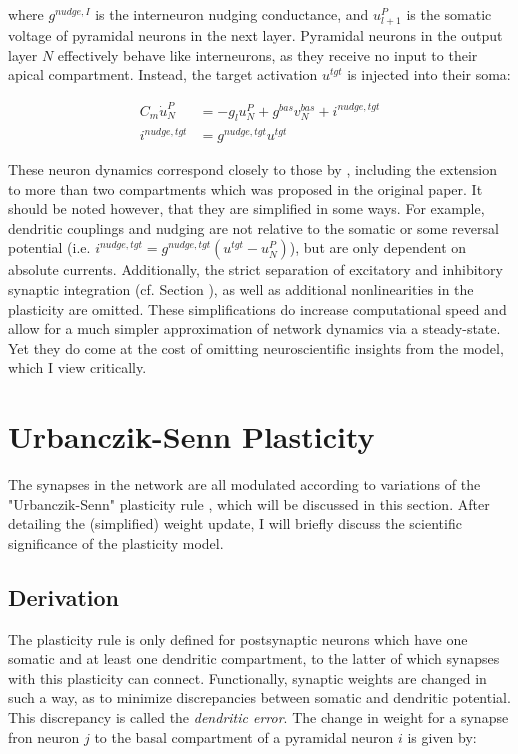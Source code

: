 where $ g^{nudge, I}$ is the interneuron nudging conductance, and $u_{l+1}^P$ is the somatic voltage of pyramidal
neurons in the next layer.  Pyramidal neurons in the output layer $N$ effectively behave like interneurons, as they
receive no input to their apical compartment. Instead, the target  activation $u^{tgt}$ is injected into their soma:

\begin{align}
  C_m \dot{u}_N^P & = - g_l u_N^{P} + g^{bas} v_N^{bas} + i^{nudge, tgt} \\
  i^{nudge, tgt}  & = g^{nudge, tgt} u^{tgt}
\end{align}


These neuron dynamics correspond closely to those by \cite{urbanczik2014learning}, including the extension to more than
two compartments which was proposed in the original paper. It should be noted however, that they are simplified in some
 ways. For example, dendritic couplings and nudging are not relative to the somatic or some reversal potential (i.e.
$i^{nudge, tgt}= g^{nudge, tgt} (u^{tgt} - u_N^P )$), but are only dependent on absolute currents. Additionally, the 
strict separation of excitatory and inhibitory synaptic integration (cf. Section ), as well as additional nonlinearities in the 
plasticity are omitted.  These simplifications do increase computational speed and allow for a much simpler approximation
of network dynamics via a steady-state. Yet they do come at the cost of omitting neuroscientific insights from the model,
which I view critically. \phrasing




\section{Urbanczik-Senn Plasticity}\label{sec-urb-senn-plast}

The synapses in the network are all modulated according to variations of the "Urbanczik-Senn" plasticity rule
\citep{urbanczik2014learning}, which will be discussed in this section. After detailing the (simplified) weight update,
I will briefly discuss the scientific significance of the plasticity model.

\subsection{Derivation}

The plasticity rule is only defined for postsynaptic neurons which have one somatic and at least one dendritic
compartment, to the latter of which synapses with this plasticity can connect. Functionally, synaptic weights are 
changed in such a way, as to minimize discrepancies between somatic and dendritic potential. This discrepancy is called
the \textit{dendritic error}. The change in
weight for a synapse fron neuron $j$ to the basal compartment of a pyramidal neuron $i$ is given by:

